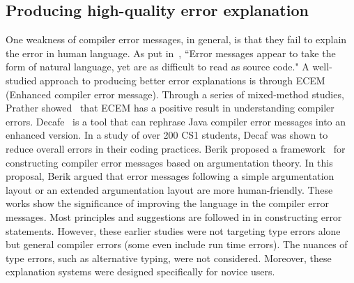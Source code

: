 \subsection{Producing high-quality error explanation}
One weakness of compiler error messages, in general, is that they fail to explain the error in human language. As put in~\cite{barik_developers_2017}, ``Error messages appear to take the form of natural language, yet are as difficult to read as source code."  A well-studied approach to producing better error explanations is through ECEM (Enhanced compiler error message). Through a series of mixed-method studies, Prather showed~\cite{prather_novices_2017} that ECEM has a positive result in understanding compiler errors. Decafe~\cite{becker_effective_2016} is a tool that can rephrase Java compiler error messages into an enhanced version. In a study of over 200 CS1 students, Decaf was shown to reduce overall errors in their coding practices. Berik proposed a framework~\cite{barik_how_2018} for constructing compiler error messages based on argumentation theory. In this proposal,  Berik argued that error messages following a simple argumentation layout or an extended argumentation layout are more human-friendly.  These works show the significance of improving the language in the compiler error messages. Most principles and suggestions are followed in \chameleon{} in constructing error statements. However, these earlier studies were not targeting type errors alone but general compiler errors (some even include run time errors). The nuances of type errors, such as alternative typing, were not considered. Moreover, these explanation systems were designed specifically for novice users. 




